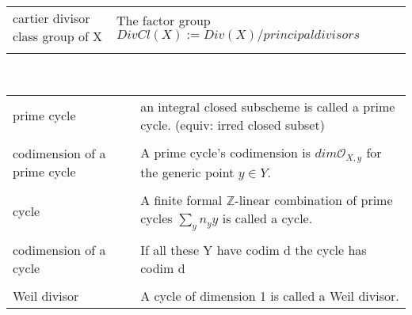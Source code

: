 \documentclass[a4paper, 12pt]{article}
\newcommand{\ca}[1]{\mathcal{#1}}
\begin{document}
\\
\newline
\\



\begin{tabular}{p{4cm} p{11cm}}

  cartier divisor class group of X & The factor group $DivCl(X) := Div(X)/{principal divisors}$\\

  \\
\end{tabular}

\\


\begin{tabular}{p{4cm} p{11cm}}


    prime cycle & an integral closed subscheme is called a prime cycle. (equiv: irred closed subset)\\

    \\

    codimension of a prime cycle & A prime cycle's codimension is $dim \ca{O}_{X,y}$ for the generic point $y \in Y$.\\

    \\

    cycle & A finite formal $\mathbb{Z}$-linear combination of prime cycles $\sum_y n_y y$ is called a cycle.\\

    \\

    codimension of a cycle & If all these Y have codim d the cycle has codim d\\

    \\

    Weil divisor & A cycle of dimension 1 is called a Weil divisor.\\

    
    
  
\end{tabular}



\begin{tabular}{p{4cm} p{11cm}}


  \end{tabular}

\begin{tabular}{p{4cm} p{11cm}}


  \end{tabular}
\end{document}
